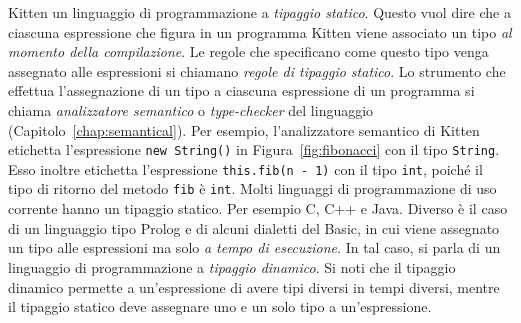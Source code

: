 Kitten \e un linguaggio di programmazione a \emph{tipaggio statico}.
Questo vuol dire che a ciascuna espressione che figura in un programma Kitten
viene associato un tipo \emph{al momento della compilazione}. Le regole che
specificano come questo tipo venga assegnato alle espressioni si chiamano
\emph{regole di tipaggio statico}. Lo strumento che effettua l'assegnazione
di un tipo a ciascuna espressione di un programma si chiama
\emph{analizzatore semantico} o \emph{type-checker}
del linguaggio (Capitolo~\ref{chap:semantical}). Per esempio, l'analizzatore
semantico di Kitten etichetta l'espressione \texttt{new String()} in
Figura~\ref{fig:fibonacci} con il tipo \texttt{String}. Esso inoltre
etichetta l'espressione \texttt{this.fib(n - 1)} con il tipo \texttt{int},
poich\'e il tipo di ritorno del metodo \texttt{fib} \`e \texttt{int}.
Molti linguaggi di programmazione di uso corrente hanno un tipaggio statico.
Per esempio C, C++ e Java. Diverso \`e il caso di un linguaggio tipo Prolog
e di alcuni dialetti del Basic,
in cui viene assegnato un tipo alle espressioni ma solo
\emph{a tempo di esecuzione}. In tal caso, si parla di un linguaggio di
programmazione a \emph{tipaggio dinamico}. Si noti che il tipaggio dinamico
permette a un'espressione di avere tipi diversi in tempi diversi, mentre
il tipaggio statico deve assegnare uno e un solo tipo a un'espressione.

